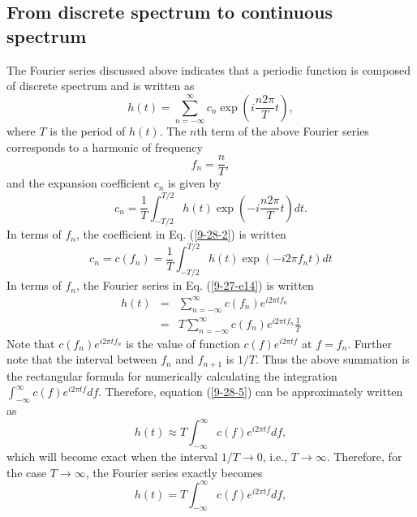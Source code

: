 \documentclass{article}
\begin{document}
\subsection{From discrete spectrum to continuous spectrum}

The Fourier series discussed above indicates that a periodic function is
composed of discrete spectrum and is written as
\begin{equation}
  \label{9-27-e14} h (t) = \sum_{n = - \infty}^{\infty} c_n \exp \left( i
  \frac{n 2 \pi}{T} t \right) ,
\end{equation}
where $T$ is the period of $h (t)$. The $n$th term of the above Fourier series
corresponds to a harmonic of frequency
\begin{equation}
  \label{9-27-e10} f_n = \frac{n}{T},
\end{equation}
and the expansion coefficient $c_n$ is given by
\begin{equation}
  \label{9-28-2} c_n = \frac{1}{T} \int_{- T / 2}^{T / 2} h (t) \exp \left( -
  i \frac{n 2 \pi}{T} t \right) d t.
\end{equation}
In terms of $f_n$, the coefficient in Eq. (\ref{9-28-2}) is written
\begin{equation}
  \label{9-27-e11} c_n = c (f_n) = \frac{1}{T} \int_{- T / 2}^{T / 2} h (t)
  \exp (- i 2 \pi f_n t)  d t
\end{equation}
In terms of $f_n$, the Fourier series in Eq. (\ref{9-27-e14}) is written
\begin{eqnarray}
  h (t) & = & \sum_{n = - \infty}^{\infty} c (f_n) e^{i 2 \pi t f_n}
  \nonumber\\
  & = & T \sum_{n = - \infty}^{\infty} c (f_n) e^{i 2 \pi t f_n} \frac{1}{T} 
  \label{9-28-5}
\end{eqnarray}
Note that $c (f_n) e^{i 2 \pi t f_n}$ is the value of function $c (f) e^{i 2
\pi t f}$ at $f = f_n$. Further note that the interval between $f_n$ and $f_{n
+ 1}$ is $1 / T$. Thus the above summation is the rectangular formula for
numerically calculating the integration $\int_{- \infty}^{\infty} c (f) e^{i 2
\pi t f} d f$. Therefore, equation (\ref{9-28-5}) can be approximately written
as
\begin{equation}
  h (t) \approx T \int_{- \infty}^{\infty} c (f) e^{i 2 \pi t f} d f,
\end{equation}
which will become exact when the interval $1 / T \rightarrow 0$, i.e., $T
\rightarrow \infty$. Therefore, for the case $T \rightarrow \infty$, the
Fourier series exactly becomes
\begin{equation}
  \label{9-28-6} h (t) = T \int_{- \infty}^{\infty} c (f) e^{i 2 \pi t f} d f,
\end{equation}
\end{document}
